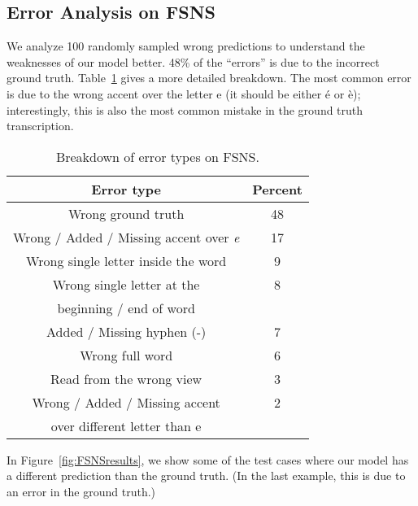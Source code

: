 \documentclass[conference]{IEEEtran}
\begin{document}
\subsection{Error Analysis on FSNS}

We analyze 100 randomly sampled wrong predictions to understand the
weaknesses of our model better. 48\% of the ``errors'' is
due to the incorrect ground truth. Table~\ref{tab:errors} gives a more
detailed breakdown. The most common error is due to  
the wrong accent over the letter e (it should be either \'e or \`e);
interestingly, this is also the most common mistake in the ground truth transcription.

\begin{table}[t]
\caption{Breakdown of error types on FSNS.}
\label{tab:errors}
\begin{center}
\begin{tabular}{| c | c |}
\hline Error type                           & Percent \\ \hline \hline
Wrong ground truth                          & 48 \\ \hline
Wrong / Added / Missing accent over \textit{e}       & 17 \\ \hline
Wrong single letter inside the word         & 9 \\ \hline
Wrong single letter at the                  & 8 \\
beginning / end of word                     &   \\ \hline
Added / Missing hyphen (-)                  & 7 \\ \hline
Wrong full word                             & 6 \\ \hline
Read from the wrong view                    & 3 \\ \hline
Wrong / Added / Missing accent              & 2 \\
over different letter than e                &   \\ \hline
\end{tabular}
\end{center}
\end{table}

In Figure~\ref{fig:FSNSresults}, we show some of the test cases where
our model has a different prediction than the ground truth. 
(In the last example, this is due to an error in the ground truth.)
\end{document}
